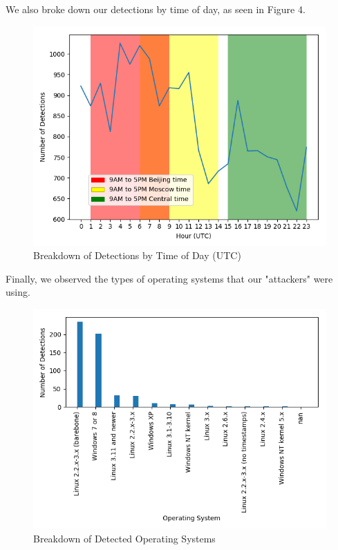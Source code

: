 \documentclass[a0,landscape]{a0poster}
\begin{document}
\begin{multicols}{3}
We also broke down our detections by time of day, as seen in Figure 4.

\begin{figure}[H]
	\begin{center}
		\includegraphics[width=25cm]{time_breakdown.png}
		\caption{Breakdown of Detections by Time of Day (UTC)}
	\end{center}
\end{figure} 

Finally, we observed the types of operating systems that our "attackers" were using.
\begin{figure}[H]
	\begin{center}
		\includegraphics[width=25cm]{top_os.png}
		\caption{Breakdown of Detected Operating Systems}
	\end{center}
\end{figure} 



\end{multicols}
\end{document}
